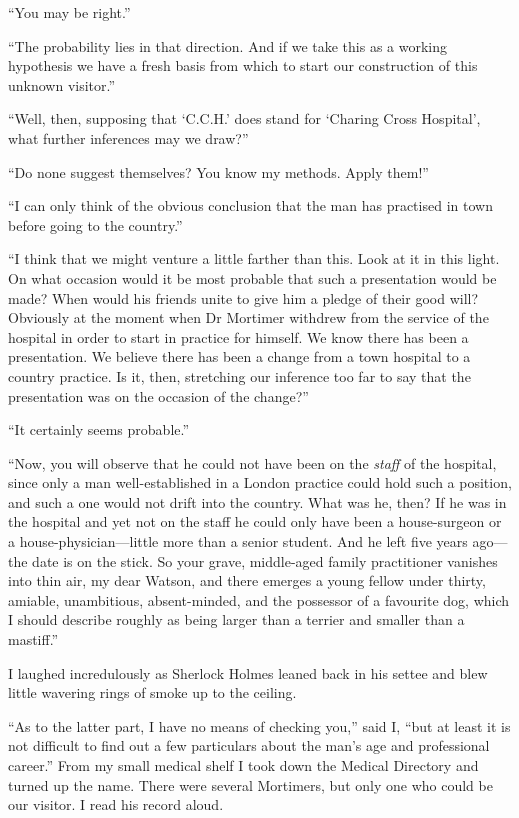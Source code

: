\documentclass[paper=5.5in:8.5in,BCOR=7mm,twoside,DIV=calc,12pt,usegeometry,openany,chapterprefix,endperiod]{scrbook} %
\begin{document}
\enquote{You may be right.}

\enquote{The probability lies in that direction. And if we take this as a working hypothesis we have a fresh basis from which to start our construction of this unknown visitor.}

\enquote{Well, then, supposing that \enquote{C.C.H.} does stand for \enquote{Charing Cross Hospital}, what further inferences may we draw?}

\enquote{Do none suggest themselves? You know my methods. Apply them!}

\enquote{I can only think of the obvious conclusion that the man has practised in town before going to the country.}

\enquote{I think that we might venture a little farther than this. Look at it in this light. On what occasion would it be most probable that such a presentation would be made? When would his friends unite to give him a pledge of their good will? Obviously at the moment when Dr Mortimer withdrew from the service of the hospital in order to start in practice for himself. We know there has been a presentation. We believe there has been a change from a town hospital to a country practice. Is it, then, stretching our inference too far to say that the presentation was on the occasion of the change?}

\enquote{It certainly seems probable.}

\enquote{Now, you will observe that he could not have been on the \emph{staff} of the hospital, since only a man well-established in a London practice could hold such a position, and such a one would not drift into the country. What was he, then? If he was in the hospital and yet not on the staff he could only have been a house-surgeon or a house-physician\nobreakdash---little more than a senior student. And he left five years ago\nobreakdash---the date is on the stick. So your grave, middle-aged family practitioner vanishes into thin air, my dear Watson, and there emerges a young fellow under thirty, amiable, unambitious, absent-minded, and the possessor of a favourite dog, which I should describe roughly as being larger than a terrier and smaller than a mastiff.}

I laughed incredulously as Sherlock Holmes leaned back in his settee and blew little wavering rings of smoke up to the ceiling.

\enquote{As to the latter part, I have no means of checking you,} said I, \enquote{but at least it is not difficult to find out a few particulars about the man's age and professional career.} From my small medical shelf I took down the Medical Directory and turned up the name. There were several Mortimers, but only one who could be our visitor. I read his record aloud.
\end{document}
